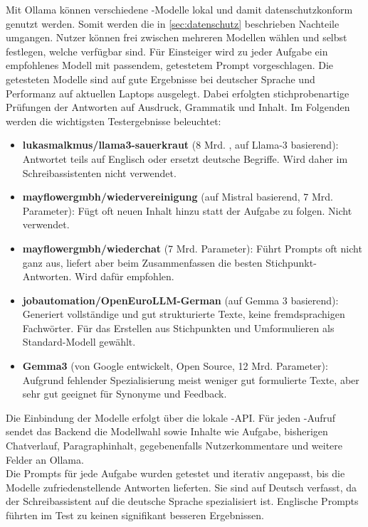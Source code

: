 \documentclass[../main.tex]{subfiles}
\begin{document}
Mit Ollama können verschiedene -Modelle lokal und damit datenschutzkonform genutzt werden. Somit werden die in \autoref{sec:datenschutz} beschrieben Nachteile umgangen. 
Nutzer können frei zwischen mehreren Modellen wählen und selbst festlegen, welche verfügbar sind. Für Einsteiger wird zu jeder Aufgabe ein empfohlenes Modell mit passendem, 
getestetem Prompt vorgeschlagen. Die getesteten Modelle sind auf gute Ergebnisse bei deutscher Sprache und Performanz auf aktuellen Laptops ausgelegt. Dabei erfolgten stichprobenartige 
Prüfungen der Antworten auf Ausdruck, Grammatik und Inhalt. Im Folgenden werden die wichtigsten Testergebnisse beleuchtet:

\begin{itemize} \item \textbf{lukasmalkmus/llama3-sauerkraut} (8 Mrd. , auf Llama-3 basierend)\cite{sauerkraut}: Antwortet teils auf Englisch oder ersetzt deutsche Begriffe. Wird daher im Schreibassistenten nicht verwendet.


\item \textbf{mayflowergmbh/wiedervereinigung} (auf Mistral basierend, 7 Mrd. Parameter)\cite{wiedervereinigung}: Fügt oft neuen Inhalt hinzu statt der Aufgabe zu folgen. Nicht verwendet.

\item \textbf{mayflowergmbh/wiederchat} (7 Mrd. Parameter)\cite{wiederchat}: Führt Prompts oft nicht ganz aus, liefert aber beim Zusammenfassen die besten Stichpunkt-Antworten. Wird dafür empfohlen.

\item \textbf{jobautomation/OpenEuroLLM-German} (auf Gemma 3 basierend)\cite{openeurollm}: Generiert vollständige und gut strukturierte Texte, keine fremdsprachigen Fachwörter. Für das Erstellen aus Stichpunkten und Umformulieren als Standard-Modell gewählt.

\item \textbf{Gemma3} (von Google entwickelt, Open Source, 12 Mrd. Parameter)\cite{gemma3}: Aufgrund fehlender Spezialisierung meist weniger gut formulierte Texte, aber sehr gut geeignet für Synonyme und Feedback. \end{itemize}

Die Einbindung der Modelle erfolgt über die lokale -API. Für jeden -Aufruf sendet das Backend die Modellwahl sowie Inhalte wie Aufgabe, bisherigen Chatverlauf, 
Paragraphinhalt, gegebenenfalls Nutzerkommentare und weitere Felder an Ollama.\\ Die Prompts für jede Aufgabe wurden getestet und iterativ angepasst, bis die Modelle zufriedenstellende Antworten 
lieferten. Sie sind auf Deutsch verfasst, da der Schreibassistent auf die deutsche Sprache spezialisiert ist. Englische Prompts führten im Test zu keinen signifikant besseren Ergebnissen.
\end{document}
